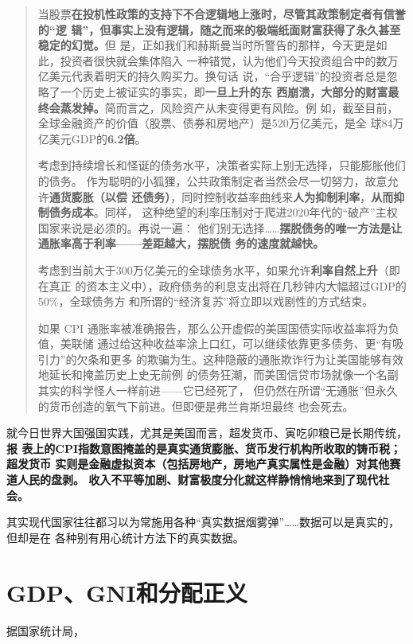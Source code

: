\begin{quotation}
  当股票\textbf{在投机性政策的支持下不合逻辑地上涨时，尽管其政策制定者有信誉的“逻
    辑”，但事实上没有逻辑，随之而来的极端纸面财富获得了永久甚至稳定的幻觉。}但
  是，正如我们和赫斯曼当时所警告的那样，今天更是如此，投资者很快就会集体陷入
  一种错觉，认为他们今天投资组合中的数万亿美元代表着明天的持久购买力。换句话
  说，“合乎逻辑”的投资者总是忽略了一个历史上被证实的事实，即\textbf{一旦上升的东
    西崩溃，大部分的财富最终会蒸发掉。}简而言之，风险资产从未变得更有风险。例
  如，截至目前，全球金融资产的价值（股票、债券和房地产）是520万亿美元，是全
  球84万亿美元GDP的\textbf{6.2倍}。

  考虑到持续增长和怪诞的债务水平，决策者实际上别无选择，只能膨胀他们的债务。
  作为聪明的小狐狸，公共政策制定者当然会尽一切努力，故意允许\textbf{通货膨胀（以偿
    还债务）}，同时控制收益率曲线来\textbf{人为抑制利率}，\textbf{从而抑制债务成本}。同样，
  这种绝望的利率压制对于爬进2020年代的“破产”主权国家来说是必须的。再说一遍：
  他们别无选择……\textbf{摆脱债务的唯一方法是让通胀率高于利率——差距越大，摆脱债
    务的速度就越快。}

  考虑到当前大于300万亿美元的全球债务水平，如果允许\textbf{利率自然上升}（即在真正
  的资本主义中），政府债务的利息支出将在几秒钟内大幅超过GDP的50\%，全球债务方
  和所谓的“经济复苏”将立即以戏剧性的方式结束。

  如果 CPI 通胀率被准确报告，那么公开虚假的美国国债实际收益率将为负值，美联储
  通过给这种收益率涂上口红，可以继续依靠更多债务、更“有吸引力”的欠条和更多
  的欺骗为生。这种隐蔽的通胀欺诈行为让美国能够有效地延长和掩盖历史上史无前例
  的债务狂潮，而美国信贷市场就像一个名副其实的科学怪人一样前进——它已经死了，
  但仍然在所谓“无通胀”但永久的货币创造的氧气下前进。但即便是弗兰肯斯坦最终
  也会死去。
\end{quotation}

就今日世界大国强国实践，尤其是美国而言，超发货币、寅吃卯粮已是长期传统，\textbf{报
  表上的CPI指数意图掩盖的是真实通货膨胀、货币发行机构所收取的铸币税；超发货币
  实则是金融虚拟资本（包括房地产，房地产真实属性是金融）对其他赛道人民的盘剥。
  收入不平等加剧、财富极度分化就这样静悄悄地来到了现代社会。}

其实现代国家往往都习以为常施用各种“真实数据烟雾弹”……数据可以是真实的，但却是在
各种别有用心统计方法下的真实数据。


\section{GDP、GNI和分配正义}

据国家统计局，

